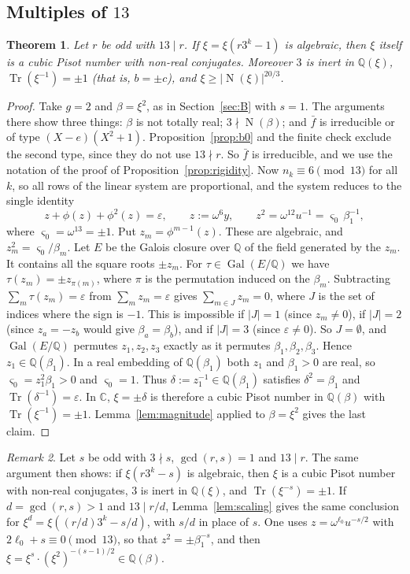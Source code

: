 \documentclass[11pt,a4paper]{article}
\newtheorem{theorem}{Theorem}[section]
\theoremstyle{definition}
\theoremstyle{remark}
\newtheorem{remark}[theorem]{Remark}
\newcommand{\Q}{\mathbb{Q}}
\newcommand{\C}{\mathbb{C}}
\DeclareMathOperator{\Tr}{Tr}
\DeclareMathOperator{\Nm}{N}
\DeclareMathOperator{\Gal}{Gal}
\begin{document}
\subsection{Multiples of $13$}
\begin{theorem}\label{thm:D13}
Let $r$ be odd with $13\mid r$.
If $\xi=\xi(r3^k-1)$ is algebraic, then $\xi$ itself is a cubic Pisot number with non-real conjugates.
Moreover $3$ is inert in $\Q(\xi)$, $\Tr(\xi^{-1})=\pm1$ (that is, $b=\pm c$), and $\xi\ge|\Nm(\xi)|^{20/3}$.
\end{theorem}
\begin{proof}
Take $g=2$ and $\beta=\xi^2$, as in Section~\ref{sec:B} with $s=1$.
The arguments there show three things: $\beta$ is not totally real; $3\nmid\Nm(\beta)$; and $\bar f$ is irreducible or of type $(X-e)(X^2+1)$.
Proposition~\ref{prop:b0} and the finite check exclude the second type, since they do not use $13\nmid r$.
So $\bar f$ is irreducible, and we use the notation of the proof of Proposition~\ref{prop:rigidity}.
Now $n_k\equiv6\pmod{13}$ for all $k$, so all rows of the linear system are proportional, and the system reduces to the single identity
\[
 z+\phi(z)+\phi^2(z)=\varepsilon,\qquad z:=\omega^6y,\qquad z^2=\omega^{12}u^{-1}=\varsigma_0\,\beta_1^{-1},
\]
where $\varsigma_0=\omega^{13}=\pm1$.
Put $z_m=\phi^{m-1}(z)$. These are algebraic, and $z_m^2=\varsigma_0/\beta_m$.
Let $E$ be the Galois closure over $\Q$ of the field generated by the $z_m$. It contains all the square roots $\pm z_m$.
For $\tau\in\Gal(E/\Q)$ we have $\tau(z_m)=\pm z_{\pi(m)}$, where $\pi$ is the permutation induced on the $\beta_m$.
Subtracting $\sum_m\tau(z_m)=\varepsilon$ from $\sum_mz_m=\varepsilon$ gives $\sum_{m\in J}z_m=0$, where $J$ is the set of indices where the sign is $-1$.
This is impossible if $|J|=1$ (since $z_m\ne0$), if $|J|=2$ (since $z_a=-z_b$ would give $\beta_a=\beta_b$), and if $|J|=3$ (since $\varepsilon\ne0$).
So $J=\emptyset$, and $\Gal(E/\Q)$ permutes $z_1,z_2,z_3$ exactly as it permutes $\beta_1,\beta_2,\beta_3$.
Hence $z_1\in\Q(\beta_1)$.
In a real embedding of $\Q(\beta_1)$ both $z_1$ and $\beta_1>0$ are real, so $\varsigma_0=z_1^2\beta_1>0$ and $\varsigma_0=1$.
Thus $\delta:=z_1^{-1}\in\Q(\beta_1)$ satisfies $\delta^2=\beta_1$ and $\Tr(\delta^{-1})=\varepsilon$.
In $\C$, $\xi=\pm\delta$ is therefore a cubic Pisot number in $\Q(\beta)$ with $\Tr(\xi^{-1})=\pm1$.
Lemma~\ref{lem:magnitude} applied to $\beta=\xi^2$ gives the last claim.
\end{proof}

\begin{remark}
Let $s$ be odd with $3\nmid s$, $\gcd(r,s)=1$ and $13\mid r$. The same argument then shows: if $\xi(r3^k-s)$ is algebraic, then $\xi$ is a cubic Pisot number with non-real conjugates, $3$ is inert in $\Q(\xi)$, and $\Tr(\xi^{-s})=\pm1$. If $d=\gcd(r,s)>1$ and $13\mid r/d$, Lemma~\ref{lem:scaling} gives the same conclusion for $\xi^{d}=\xi((r/d)3^k-s/d)$, with $s/d$ in place of $s$.
One uses $z=\omega^{\ell_0}u^{-s/2}$ with $2\ell_0+s\equiv0\pmod{13}$, so that $z^2=\pm\beta_1^{-s}$, and then $\xi=\xi^s\cdot(\xi^2)^{-(s-1)/2}\in\Q(\beta)$.
\end{remark}
\end{document}
